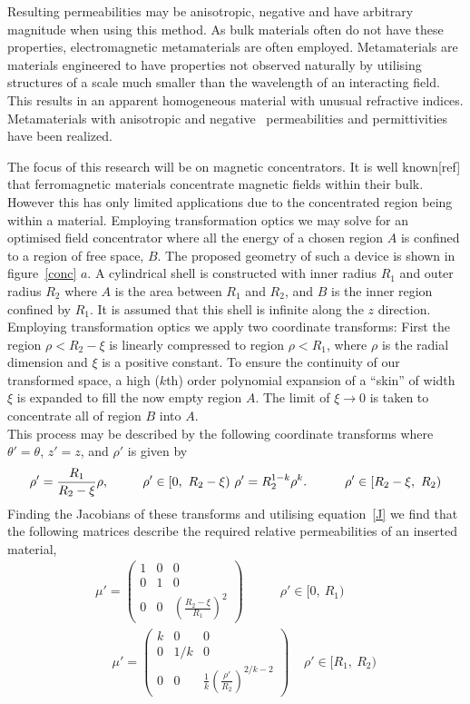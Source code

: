 \documentclass[11pt]{iopart}
\begin{document}
\noindent Resulting permeabilities may be anisotropic, negative and
have arbitrary magnitude when using this method. As bulk materials
often do not have these properties, electromagnetic metamaterials are
often employed.  Metamaterials are materials engineered to have
properties not observed naturally by utilising structures of a scale
much smaller than the wavelength of an interacting field. This results
in an apparent homogeneous material with unusual refractive
indices. Metamaterials with anisotropic and negative~\cite{Pendry2000}
permeabilities and permittivities have been realized.

The focus of this research will be on magnetic concentrators. It is
well known[ref] that ferromagnetic materials concentrate magnetic
fields within their bulk. However this has only limited applications
due to the concentrated region being within a material.
Employing
transformation optics we may solve for an optimised field concentrator
where all the energy of a chosen region $A$ is confined to a
region of free space, $B$. The proposed geometry of such a device is
shown in figure~\ref{conc} $a$.
A cylindrical shell is constructed with inner radius $R_1$ and outer
radius $R_2$ where $A$ is the area between $R_1$ and $R_2$, and $B$ is
the inner region confined by $R_1$. It is assumed that this shell is
infinite along the $z$ direction.  Employing transformation optics we
apply two coordinate transforms: First the region $\rho < R_2 - \xi$
is linearly compressed to region $\rho < R_1$, where $\rho$ is the
radial dimension and $\xi$ is a positive constant.  To ensure the
continuity of our transformed space, a high ($k$th) order polynomial
expansion of a ``skin'' of width $\xi$ is expanded to fill the now
empty region $A$. The limit of $\xi \rightarrow 0$ is taken to
concentrate all of region $B$ into $A$. \\
This process may be described by the following coordinate transforms
where $\theta' = \theta$, $z' = z$, and $\rho'$ is given by
\begin{equation}
  \label{transform}
\rho' = \frac{R_1}{R_2-\xi}\rho,~~~~~~~~\rho'\in[0,~R_2-\xi)~~\\
\rho' = R_2^{1-k}\rho^k.~~~~~~~~~\rho'\in[R_2-\xi,~R_2)
\end{equation}
Finding the Jacobians of these transforms and utilising
equation~\ref{J} we find that the following matrices describe the
required relative permeabilities of an inserted material,
\begin{equation}
  \label{mat}
  \begin{split}
 \mu' = \begin{pmatrix}1&0&0\\0&1&0\\0&0&(\frac{R_2-\xi}{R_1})^2\end{pmatrix}~~~~~~~~~~~~~\rho'\in[0,~R_1)~~\\
~~~~~~\mu' = \begin{pmatrix}k&0&0\\0&1/k&0\\0&0&\frac{1}{k}(\frac{\rho'}{R_2})^{2/k-2}\end{pmatrix}~~~~~\rho'\in[R_1,~R_2)
  \end{split}
\end{equation}
\end{document}
